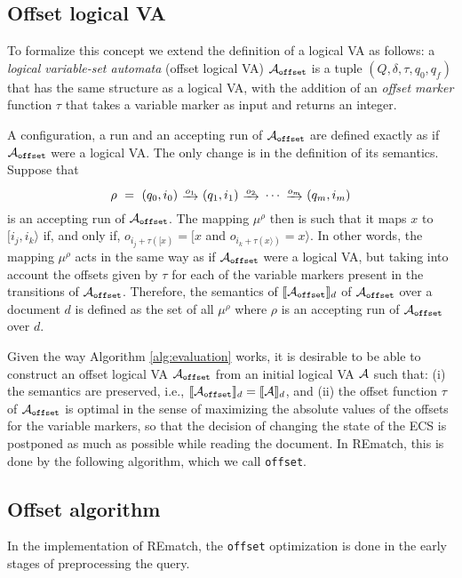 \subsection{Offset logical VA} 
To formalize this concept we extend the definition of a logical VA as follows: a
\emph{logical variable-set automata} (offset logical VA) $\mathcal{A}_{\texttt{offset}}$ is a tuple
$(Q, \delta, \tau, q_0, q_f)$ that has the same structure as a logical VA, with
the addition of an \emph{offset marker} function $\tau$ that takes a variable
marker as input and returns an integer.

A configuration, a run and an accepting run of $\mathcal{A}_{\texttt{offset}}$ are defined exactly as
if $\mathcal{A}_{\texttt{offset}}$ were a logical VA. The only change is in the definition of its
semantics. Suppose that 
$$
	\rho \ = \ (q_0, i_0) \ \trans{o_1} \ (q_1, i_1) \ \trans{o_2} \ \cdots \ \trans{o_m} \ (q_m, i_m)
$$
is an accepting run of $\mathcal{A}_{\texttt{offset}}$. The mapping $\mu^\rho$ then is such that it
maps $x$ to $[i_j, i_k\rangle$ if, and only if, $o_{i_j + \tau([x)} = [x$ and
$o_{i_k + \tau(x\rangle)} = x\rangle$. In other words, the mapping $\mu^\rho$
acts in the same way as if $\mathcal{A}_{\texttt{offset}}$ were a logical VA, but taking into account
the offsets given by $\tau$ for each of the variable markers present in the
transitions of $\mathcal{A}_{\texttt{offset}}$. Therefore, the semantics of $\llbracket\mathcal{A}_{\texttt{offset}}\rrbracket_d$ of
$\mathcal{A}_{\texttt{offset}}$ over a document $d$ is defined as the set of all $\mu^\rho$ where
$\rho$ is an accepting run of $\mathcal{A}_{\texttt{offset}}$ over $d$.

Given the way Algorithm \ref*{alg:evaluation} works, it is desirable to be able
to construct an offset logical VA $\mathcal{A}_{\texttt{offset}}$ from an initial logical VA $\mathcal{A}$ such
that: (i) the semantics are preserved, i.e., $\llbracket\mathcal{A}_{\texttt{offset}}\rrbracket_d = \llbracket\mathcal{A}\rrbracket_d$, and
(ii) the offset function $\tau$ of $\mathcal{A}_{\texttt{offset}}$ is optimal in the sense of
maximizing the absolute values of the offsets for the variable markers, so that
the decision of changing the state of the ECS is postponed as much as possible
while reading the document. In REmatch, this is done by the following algorithm,
which we call \texttt{offset}.

\subsection{Offset algorithm}
In the implementation of REmatch, the \texttt{offset} optimization is done in
the early stages of preprocessing the query.

